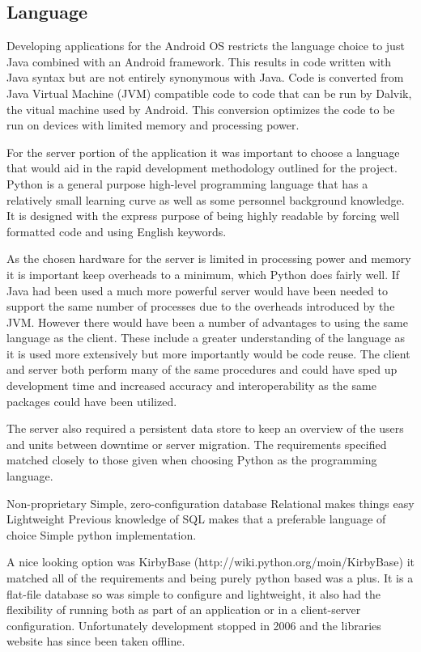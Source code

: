 \subsection{Language}
Developing applications for the Android OS restricts the language choice to just Java combined with an Android framework. This results in code written with Java syntax but are not entirely synonymous with Java. Code is converted from Java Virtual Machine (JVM) compatible code to code that can be run by Dalvik, the vitual machine used by Android. This conversion optimizes the code to be run on devices with limited memory and processing power.

For the server portion of the application it was important to choose a language that would aid in the rapid development methodology outlined for the project. Python is a general purpose high-level programming language that has a relatively small learning curve as well as some personnel background knowledge. It is designed with the express purpose of being highly readable by forcing well formatted code and using English keywords. 

As the chosen hardware for the server is limited in processing power and memory it is important keep overheads to a minimum, which Python does fairly well. If Java had been used a much more powerful server would have been needed to support the same number of processes due to the overheads introduced by the JVM. However there would have been a number of advantages to using the same language as the client. These include a greater understanding of the language as it is used more extensively but more importantly would be code reuse. The client and server both perform many of the same procedures and could have sped up development time and increased accuracy and interoperability as the same packages could have been utilized.

The server also required a persistent data store to keep an overview of the users and units between downtime or server migration. The requirements specified matched closely to those given when choosing Python as the programming language. 


    Non-proprietary
    Simple, zero-configuration database
    Relational makes things easy
    Lightweight
    Previous knowledge of SQL makes that a preferable language of choice
    Simple python implementation.

A nice looking option was KirbyBase (http://wiki.python.org/moin/KirbyBase) it matched all of the requirements and being purely python based was a plus. It is a flat-file database so was simple to configure and lightweight, it also had the flexibility of running both as part of an application or in a client-server configuration. Unfortunately development stopped in 2006 and the libraries website has since been taken offline.

